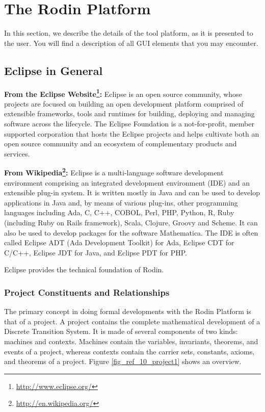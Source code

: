 \section{The Rodin Platform}
\label{rodin_platform}

In this section, we describe the details of the tool platform, as it is presented to the user.  You will find a description of all GUI elements that you may encounter.

\subsection{Eclipse in General}
\label{eclipse}

\textbf{From the Eclipse Website\footnote{\url{http://www.eclipse.org/}}:}
Eclipse is an open source community, whose projects are focused on building an open development platform comprised of extensible frameworks, tools and runtimes for building, deploying and managing software across the lifecycle. The Eclipse Foundation is a not-for-profit, member supported corporation that hosts the Eclipse projects and helps cultivate both an open source community and an ecosystem of complementary products and services.

\textbf{From Wikipedia\footnote{\url{http://en.wikipedia.org/}}:}
Eclipse is a multi-language software development environment comprising an integrated development environment (IDE) and an extensible plug-in system. It is written mostly in Java and can be used to develop applications in Java and, by means of various plug-ins, other programming languages including Ada, C, C++, COBOL, Perl, PHP, Python, R, Ruby (including Ruby on Rails framework), Scala, Clojure, Groovy and Scheme. It can also be used to develop packages for the software Mathematica. The IDE is often called Eclipse ADT (Ada Development Toolkit) for Ada, Eclipse CDT for C/C++, Eclipse JDT for Java, and Eclipse PDT for PHP.

Eclipse provides the technical foundation of Rodin.

\subsubsection{Project Constituents and Relationships}
\label{project}

The primary concept in doing formal developments with the Rodin Platform is that of a project. A project contains the complete mathematical development of a Discrete Transition System. It is made of several components of two kinds: machines and contexts. Machines contain the variables, invariants, theorems, and events of a project, whereas contexts contain the carrier sets, constants, axioms, and theorems of a project. Figure \ref{fig_ref_10_project1} shows an overview.

